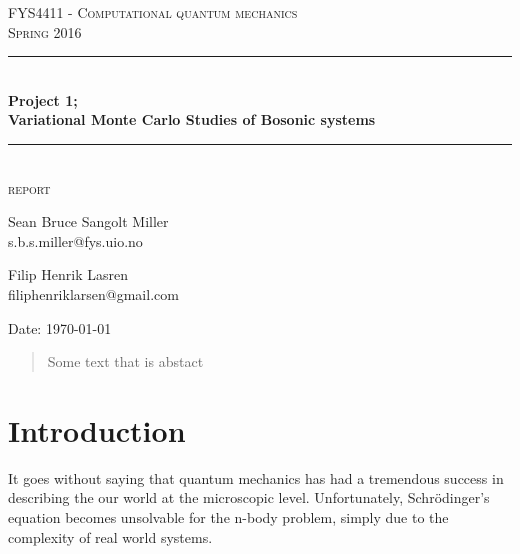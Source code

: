 \documentclass[english, a4paper]{article}
\begin{document}
\renewcommand{\figurename}{Figure}
\begin{titlepage}
\begin{center}

\textsc{\Large FYS4411 - Computational quantum mechanics }\\[0.5cm]
\textsc{\Large Spring 2016}\\[1.5cm]
\rule{\linewidth}{0.5mm} \\[0.4cm]
{ \huge \bfseries  Project 1;\\ Variational Monte Carlo Studies of Bosonic systems}\\[0.10cm]
\rule{\linewidth}{0.5mm} \\[1.5cm]
\textsc{\Large report}\\[1.5cm]


\begin{minipage}{\textwidth}
\begin{minipage}{0.49\textwidth}
    \begin{center} \large
        Sean Bruce Sangolt Miller\\
        {\footnotesize s.b.s.miller@fys.uio.no}
    \end{center}
\end{minipage}
\quad
\begin{minipage}{0.49\textwidth}
    \begin{center} \large
        Filip Henrik Lasren\\
        {\footnotesize filiphenriklarsen@gmail.com}
    \end{center}
\end{minipage}
\end{minipage}
\vfill

\large{Date: \today}

\end{center}
\end{titlepage}

\begin{abstract}
 Some text that is abstact
\end{abstract}


\tableofcontents
\newpage
{}%


\section{Introduction}
It goes without saying that quantum mechanics has had a tremendous success in describing the our world at the microscopic level. Unfortunately, Schr\"odinger's equation becomes unsolvable for the n-body problem, simply due to the complexity of real world systems.
\end{document}

